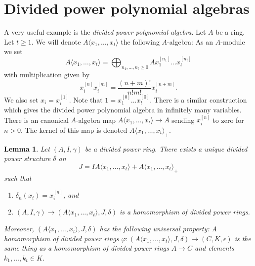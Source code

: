 \documentclass{stacks-project}
\theoremstyle{plain}
\newtheorem{lemma}[subsection]{Lemma}
\theoremstyle{definition}
\theoremstyle{remark}
\numberwithin{equation}{subsection}
\begin{document}
\section{Divided power polynomial algebras}
\label{section-divided-power-polynomial-ring}

\noindent
A very useful example is the {\it divided power polynomial algebra}.
Let $A$ be a ring. Let $t \geq 1$. We will denote
$A\langle x_1, \ldots, x_t \rangle$ the following $A$-algebra:
As an $A$-module we set
$$
A\langle x_1, \ldots, x_t \rangle =
\bigoplus\nolimits_{n_1, \ldots, n_t \geq 0} A x_1^{[n_1]} \ldots x_t^{[n_t]}
$$
with multiplication given by
$$
x_i^{[n]}x_i^{[m]} = \frac{(n + m)!}{n!m!}x_i^{[n + m]}.
$$
We also set $x_i = x_i^{[1]}$. Note that
$1 = x_1^{[0]} \ldots x_t^{[0]}$. There is a similar construction
which gives the divided power polynomial algebra in infinitely many
variables. There is an canonical $A$-algebra map
$A\langle x_1, \ldots, x_t \rangle \to A$ sending $x_i^{[n]}$ to zero
for $n > 0$. The kernel of this map is denoted
$A\langle x_1, \ldots, x_t \rangle_{+}$.

\begin{lemma}
\label{lemma-divided-power-polynomial-algebra}
Let $(A, I, \gamma)$ be a divided power ring.
There exists a unique divided power structure $\delta$ on
$$
J = IA\langle x_1, \ldots, x_t \rangle + A\langle x_1, \ldots, x_t \rangle_{+}
$$
such that
\begin{enumerate}
\item $\delta_n(x_i) = x_i^{[n]}$, and
\item $(A, I, \gamma) \to (A\langle x_1, \ldots, x_t \rangle, J, \delta)$
is a homomorphism of divided power rings.
\end{enumerate}
Moreover, $(A\langle x_1, \ldots, x_t \rangle, J, \delta)$ has the
following universal property: A homomorphism of divided power rings
$\varphi : (A\langle x_1, \ldots, x_t \rangle, J, \delta) \to
(C, K, \epsilon)$ is
the same thing as a homomorphism of divided power rings
$A \to C$ and elements $k_1, \ldots, k_t \in K$.
\end{lemma}
\end{document}
